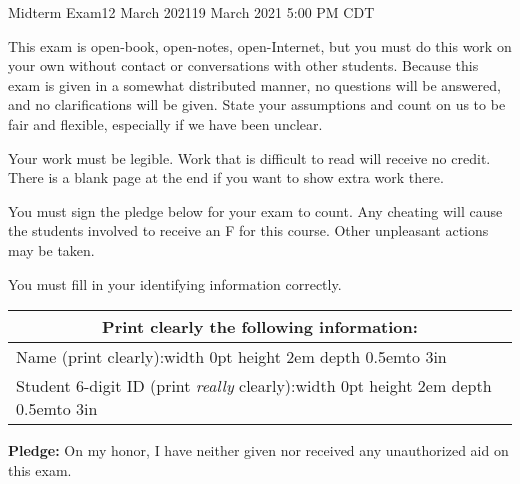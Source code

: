 \documentclass[12pt]{article}
\def\Tall{\vrule width 0pt height 2em depth 0.5em}
\begin{document}
\begin{assignment}{Midterm Exam}{12 March 2021}{19 March 2021 5:00 PM CDT}

{\small {\large {}}
This exam is open-book, open-notes, open-Internet, but you must do this
work on your own without contact or conversations with other students.
Because this exam is given in a somewhat distributed manner, no questions will be answered, and no clarifications will be given.  State your assumptions and count on us to be fair and flexible, especially if we have been unclear.


Your work must be legible.  Work that is
difficult to read will receive no credit.  There is a blank page at the end
if you want to show extra work there.

You must sign the pledge below for your exam to count.  Any cheating will
cause the students involved to receive an F for this course. Other unpleasant
actions
may be taken.

You must fill in your identifying information correctly.  
}

\begin{center}\large
\begin{tabular}{|c|c|c|} \hline
\multicolumn{3}{|c|}{{\bf Print  clearly} the following information:}  \\ \hline
\multicolumn{3}{|l|}{Name (print clearly):\Tall{}\hbox to 3in{\hss}}  \\ \hline
\multicolumn{3}{|l|}{Student 6-digit ID (print {\it really} clearly):\Tall{}\hbox to 3in{\hss}} \\ \hline
\end{tabular}
\end{center}

{\bf Pledge:} On my honor, I have neither
given nor received any unauthorized aid on this exam.


\end{assignment}
\end{document}
